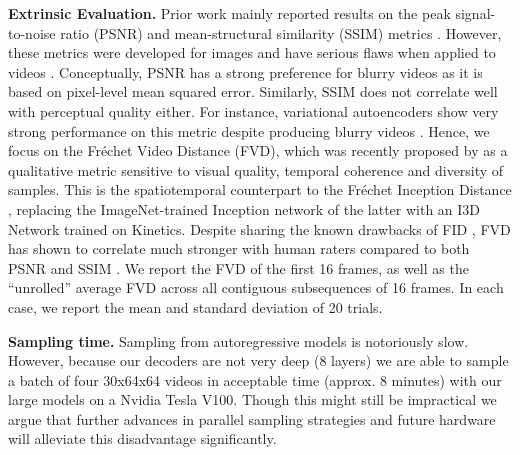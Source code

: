 \documentclass{article} \usepackage{iclr2020_conference,times}
\begin{document}
\textbf{Extrinsic Evaluation.}
Prior work mainly reported results on the peak signal-to-noise ratio (PSNR) and mean-structural similarity (SSIM) metrics \citep{Wang2004ImageQuality}.
However, these metrics were developed for images and have serious flaws when applied to videos \citep{Wang2004VideoSSIM, Wang2007VideoHuman, Zhang2018Unreasonable, Lee2018SAVP}. Conceptually, PSNR has a strong preference for blurry videos as it is based on pixel-level mean squared error. Similarly, SSIM does not correlate well with perceptual quality either. For instance, variational autoencoders show very strong performance on this metric despite producing blurry videos \citep{Lee2018SAVP}. Hence, we focus on the Fr\'{e}chet Video Distance (FVD), which was recently proposed by \citet{Unterthiner2018FVD} as a qualitative metric sensitive to visual quality, temporal coherence and diversity of samples. This is the spatiotemporal counterpart to the Fr\'{e}chet Inception Distance \citep{Heusel2017FID}, replacing the ImageNet-trained Inception network of the latter with an I3D Network trained on Kinetics. Despite sharing the known drawbacks of FID \citep{Binkowski2018}, FVD has shown to correlate much stronger with human raters compared to both PSNR and SSIM \citep{Unterthiner2018FVD}. We report the FVD of the first 16 frames, as well as the ``unrolled'' average FVD across all contiguous subsequences of 16 frames. In each case, we report the mean and standard deviation of 20 trials.

\textbf{Sampling time.} Sampling from autoregressive models is notoriously slow. However, because our decoders are not very deep (8 layers) we are able to sample a batch of four 30x64x64 videos in acceptable time (approx. 8 minutes) with our large models on a Nvidia Tesla V100. Though this might still be impractical we argue that further advances in parallel sampling strategies \citep{Stern2018BlockwisePD} and future hardware will alleviate this disadvantage significantly.
\end{document}
